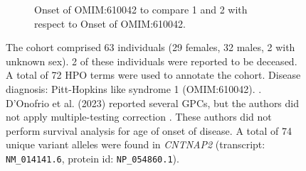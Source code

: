 \begin{figure}[htbp]
\vspace{2em}

\begin{subfigure}[b]{0.95\textwidth}
\captionsetup{justification=raggedright,singlelinecheck=false}
\caption{Onset of OMIM:610042 to compare 1 and 2 with respect to Onset of OMIM:610042.}
\end{subfigure}

\vspace{2em}

\caption{The cohort comprised 63 individuals (29 females, 32 males, 2 with unknown sex). 
2 of these individuals were reported to be deceased. A total of 72 HPO terms were used to 
annotate the cohort. Disease diagnosis: Pitt-Hopkins like syndrome 1 (OMIM:610042). 
. D'Onofrio et al. (2023) reported several GPCs, but the authors did not
apply multiple-testing correction \cite{PMID_37183190}. These authors did not perform survival analysis for age of onset of disease.
A total of 74 unique variant alleles were found in \textit{CNTNAP2} (transcript: \texttt{NM\_014141.6}, protein id: \texttt{NP\_054860.1}).}
\end{figure}
